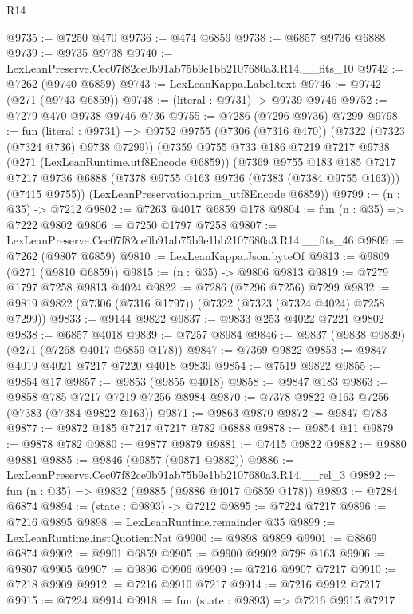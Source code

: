 \begin{lexlean}{R14}
\begin{coremodule}
@9735 := @7250 @470
@9736 := @474 @6859
@9738 := @6857 @9736 @6888
@9739 := @9735 @9738
@9740 := LexLeanPreserve.Cec07f82ce0b91ab75b9e1bb2107680a3.R14.__fits_10
@9742 := @7262 (@9740 @6859)
@9743 := LexLeanKappa.Label.text
@9746 := @9742 (@271 (@9743 @6859))
@9748 := (literal : @9731) -> @9739 @9746
@9752 := @7279 @470 @9738 @9746 @736
@9755 := @7286 (@7296 @9736) @7299
@9798 := fun (literal : @9731) =>
  @9752
    @9755
    (@7306 (@7316 @470))
    (@7322 (@7323 (@7324 @736) @9738 @7299))
    (@7359
      @9755
      @733
      @186
      @7219
      @7217
      @9738
      (@271 (LexLeanRuntime.utf8Encode @6859))
      (@7369
        @9755
        @183
        @185
        @7217
        @7217
        @9736
        @6888
        (@7378 @9755 @163 @9736 (@7383 (@7384 @9755 @163)))
        (@7415 @9755))
      (LexLeanPreservation.prim_utf8Encode @6859))
@9799 := (n : @35) -> @7212
@9802 := @7263 @4017 @6859 @178
@9804 := fun (n : @35) => @7222 @9802
@9806 := @7250 @1797 @7258
@9807 := LexLeanPreserve.Cec07f82ce0b91ab75b9e1bb2107680a3.R14.__fits_46
@9809 := @7262 (@9807 @6859)
@9810 := LexLeanKappa.Json.byteOf
@9813 := @9809 (@271 (@9810 @6859))
@9815 := (n : @35) -> @9806 @9813
@9819 := @7279 @1797 @7258 @9813 @4024
@9822 := @7286 (@7296 @7256) @7299
@9832 := @9819 @9822 (@7306 (@7316 @1797)) (@7322 (@7323 (@7324 @4024) @7258 @7299))
@9833 := @9144 @9822
@9837 := @9833 @253 @4022 @7221 @9802
@9838 := @6857 @4018
@9839 := @7257 @8984
@9846 := @9837 (@9838 @9839) (@271 (@7268 @4017 @6859 @178))
@9847 := @7369 @9822
@9853 := @9847 @4019 @4021 @7217 @7220 @4018 @9839
@9854 := @7519 @9822
@9855 := @9854 @17
@9857 := @9853 (@9855 @4018)
@9858 := @9847 @183
@9863 := @9858 @785 @7217 @7219 @7256 @8984
@9870 := @7378 @9822 @163 @7256 (@7383 (@7384 @9822 @163))
@9871 := @9863 @9870
@9872 := @9847 @783
@9877 := @9872 @185 @7217 @7217 @782 @6888
@9878 := @9854 @11
@9879 := @9878 @782
@9880 := @9877 @9879
@9881 := @7415 @9822
@9882 := @9880 @9881
@9885 := @9846 (@9857 (@9871 @9882))
@9886 := LexLeanPreserve.Cec07f82ce0b91ab75b9e1bb2107680a3.R14.__rel_3
@9892 := fun (n : @35) => @9832 (@9885 (@9886 @4017 @6859 @178))
@9893 := @7284 @6874
@9894 := (state : @9893) -> @7212
@9895 := @7224 @7217
@9896 := @7216 @9895
@9898 := LexLeanRuntime.remainder @35
@9899 := LexLeanRuntime.instQuotientNat
@9900 := @9898 @9899
@9901 := @8869 @6874
@9902 := @9901 @6859
@9905 := @9900 @9902 @798 @163
@9906 := @9807 @9905
@9907 := @9896 @9906
@9909 := @7216 @9907 @7217
@9910 := @7218 @9909
@9912 := @7216 @9910 @7217
@9914 := @7216 @9912 @7217
@9915 := @7224 @9914
@9918 := fun (state : @9893) => @7216 @9915 @7217

\end{coremodule}
\end{lexlean}
